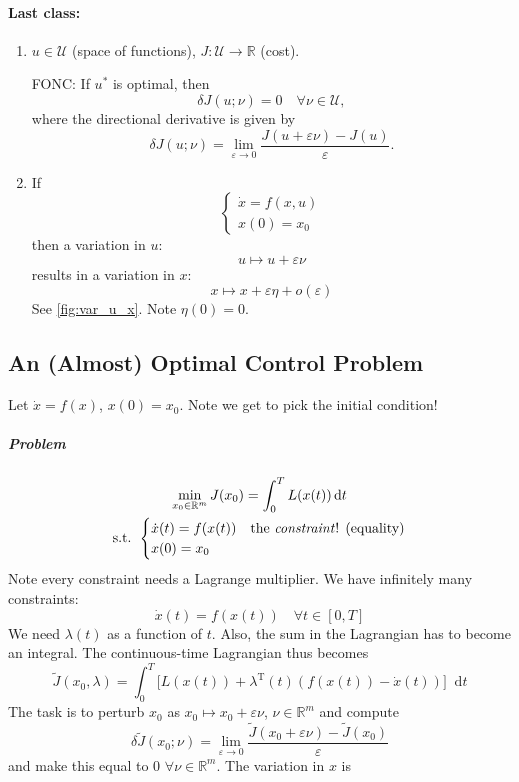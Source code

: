 \documentclass[letterpaper,12pt,titlepage]{report}
\newcommand*\dif{\mathop{}\!\mathrm{d}}
\newcommand{\trans}{^\text{T}}
\newcommand*\R{\mathbb{R}}
\newcommand*\U{\mathcal{U}}
\theoremstyle{plain}
\theoremstyle{definition}
\begin{document}
\paragraph{Last class:} \mbox{}
\begin{enumerate}
\item $u\in\U$ (space of functions), $J:\U\to\R$ (cost).

  FONC: If $u^*$ is optimal, then
  \[ \delta J(u;\nu) = 0 \quad \forall \nu\in\U, \]
  where the directional derivative is given by
  \[ \delta J(u;\nu) = \lim_{\varepsilon\to0} \frac{J(u+\varepsilon \nu)-J(u)}{\varepsilon}. \]
\item If
  \[ \begin{cases}
      \dot x = f(x,u) \\
      x(0) = x_0
    \end{cases} \]
  then a variation in $u$:
  \[ u \longmapsto u+\varepsilon \nu \]
  results in a variation in $x$:
  \[ x \longmapsto x+\varepsilon\eta + o(\varepsilon) \]
  See \autoref{fig:var_u_x}. Note $\eta(0)=0$.
\end{enumerate}

\subsection{An (Almost) Optimal Control Problem}

Let $\dot x=f(x)$, $x(0)=x_0$. Note we get to pick the initial condition!
\subparagraph{Problem}
\begin{gather}
  \min_{x_0\in\R^m} J(x_0) = \int_0^T L(x(t)) \dif t \\
  \text{s.t. } \begin{cases}
    \dot x(t) = f(x(t)) & \text{the \emph{constraint}! (equality)} \\
    x(0)=x_0
  \end{cases}
\end{gather}
Note every constraint needs a Lagrange multiplier. We have infinitely many constraints:
\[ \dot x(t) = f(x(t)) \quad \forall t\in[0,T] \]
We need $\lambda(t)$ as a function of $t$. Also, the sum in the Lagrangian has to become an integral. The continuous-time Lagrangian thus becomes
\[ \tilde J(x_0,\lambda) = \int_0^T \Big[ L(x(t)) + \lambda\trans(t) (f(x(t))-\dot x(t)) \Big] \dif t \]
The task is to perturb $x_0$ as $x_0\longmapsto x_0+\varepsilon \nu$, $\nu\in\R^m$ and compute
\[ \delta \tilde J(x_0;\nu) = \lim_{\varepsilon\to0} \frac{\tilde J(x_0+\varepsilon \nu)-\tilde J(x_0)}{\varepsilon} \]
and make this equal to 0 $\forall \nu\in\R^m$. The variation in $x$ is
\end{document}
